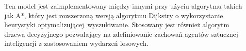 Ten model jest zaimplementowany między innymi przy użyciu algorytmu takich jak A*, który jest rozszerzoną wersją algorytmu Dijkstry o wykorzystanie heurystyki 
optymalizującej wyszukiwanie. Stosowany jest również algorytm drzewa decyzyjnego pozwalający na zdefiniowanie zachowań agentów sztucznej inteligencji z zastosowaniem wydarzeń losowych.
